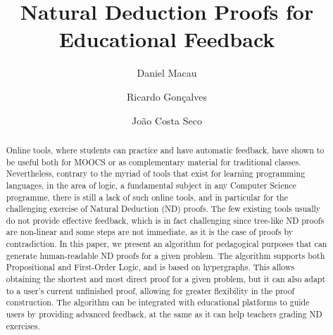 \documentclass[runningheads]{llncs}
\begin{document}
\title{Natural Deduction Proofs for Educational Feedback}

\author{Daniel Macau
\and Ricardo Gonçalves
\and João Costa Seco}


\maketitle 

\begin{abstract}
Online tools, where students can practice and have automatic feedback, have shown to be useful both for MOOCS or as complementary material for traditional classes. Nevertheless, contrary to the myriad of tools that exist for learning programming languages, in the area of logic, a fundamental subject in any Computer Science programme, there is still a lack of such online tools, and in particular for the challenging exercise of Natural Deduction (ND) proofs. The few existing tools usually do not provide effective feedback, which is in fact challenging since tree-like ND proofs are non-linear and some steps are not immediate, as it is the case of proofs by contradiction. In this paper, we present an algorithm for pedagogical purposes that can generate human-readable ND proofs for a given problem. The algorithm supports both Propositional and First-Order Logic, and is based on hypergraphs. This allows obtaining the shortest and most direct proof for a given problem, but it can also adapt to a user’s current unfinished proof, allowing for greater flexibility in the proof construction. The algorithm can be integrated with educational platforms to guide users by providing advanced feedback, at the same as it can help teachers grading ND exercises. 

\end{abstract}





%




\end{document}
